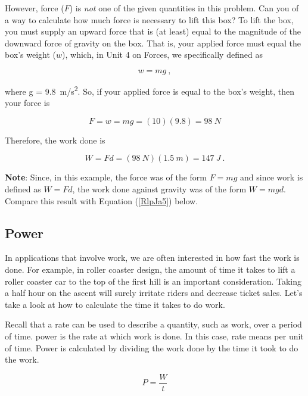 \documentclass[main.tex]{subfiles}
\begin{document}
However, force ($F$) is \textit{not} one of the given quantities in this problem. Can you of a way to calculate how much force is necessary to lift this box? To lift the box, you must supply an upward force that is (at least) equal to the magnitude of the downward force of gravity on the box. That is, your applied force must equal the box's weight ($w$), which, in Unit 4 on Forces, we specifically defined as

\begin{equation*}
    w = m g\ ,
\end{equation*}

where  g = \SI{9.8}{m/s^2}. So, if your applied force is equal to the box's weight, then your force is

\begin{equation*}
    F = w = mg = (10)(9.8) = \SI{98}{N}
\end{equation*}

Therefore, the work done is

\begin{equation*}
    W = F d = (\SI{98}{N})(\SI{1.5}{m}) = \SI{147}{J} \ .
\end{equation*}

\textbf{Note}: Since, in this example, the force was of the form $F = mg$ and since work is defined as $W = F d$, the work done against gravity was of the form $W = mgd$. Compare this result with Equation (\ref{RlpJa5}) below.

\cyanhrule

\subsection{Power} \label{bxZysw}

In applications that involve work, we are often interested in how fast the work is done. For example, in roller coaster design, the amount of time it takes to lift a roller coaster car to the top of the first hill is an important consideration. Taking a half hour on the ascent will surely irritate riders and decrease ticket sales. Let's take a look at how to calculate the time it takes to do work.
\vspace{1em}

Recall that a rate can be used to describe a quantity, such as work, over a period of time. \Gls{power} is the rate at which work is done. In this case, rate means per unit of time. Power is calculated by dividing the work done by the time it took to do the work.

\begin{equation} \label{k6uV1p}
    P = \frac{W}{t}
\end{equation}
\end{document}
